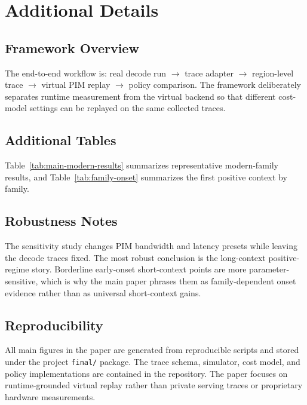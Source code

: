\section{Additional Details}

\subsection{Framework Overview}

The end-to-end workflow is: real decode run $\rightarrow$ trace adapter $\rightarrow$ region-level trace $\rightarrow$ virtual PIM replay $\rightarrow$ policy comparison. The framework deliberately separates runtime measurement from the virtual backend so that different cost-model settings can be replayed on the same collected traces.

\subsection{Additional Tables}

Table~\ref{tab:main-modern-results} summarizes representative modern-family results, and Table~\ref{tab:family-onset} summarizes the first positive context by family.




\subsection{Robustness Notes}

The sensitivity study changes PIM bandwidth and latency presets while leaving the decode traces fixed. The most robust conclusion is the long-context positive-regime story. Borderline early-onset short-context points are more parameter-sensitive, which is why the main paper phrases them as family-dependent onset evidence rather than as universal short-context gains.

\subsection{Reproducibility}

All main figures in the paper are generated from reproducible scripts and stored under the project \texttt{final/} package. The trace schema, simulator, cost model, and policy implementations are contained in the repository. The paper focuses on runtime-grounded virtual replay rather than private serving traces or proprietary hardware measurements.
